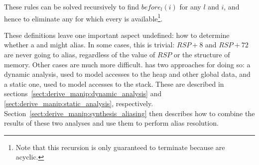 These rules can be solved recursively to find $before_l(i)$ for any
$l$ and $i$, and hence to eliminate any  for which every
 is available\footnote{Note that this recursion is only
  guaranteed to terminate because {\StateMachines} are acyclic.}.

These definitions leave one important aspect undefined: how to
determine whether a  and  might alias.  In
some cases, this is trivial: $RSP+8$ and $RSP+72$ are never going to
alias, regardless of the value of $RSP$ or the structure of memory.
Other cases are much more difficult.  {\Technique} has two approaches
for doing so: a dynamic analysis, used to model accesses to the heap
and other global data, and a static one, used to model accesses to the
stack.  These are described in
sections~\ref{sect:derive_manip:dynamic_analysis} and
\ref{sect:derive_manip:static_analysis}, respectively.
Section~\ref{sect:derive_manip:synthesis_aliasing} then describes how
to combine the results of these two analyses and use them to perform
alias resolution.


